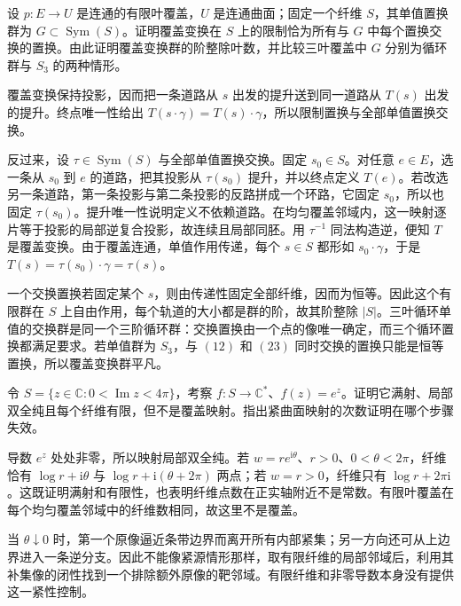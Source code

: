 \begin{exercise}
	\label{g4:ex:0201:deck-centralizer}
	设 \(p:E\to U\) 是连通的有限叶覆盖，\(U\) 是连通曲面；固定一个纤维 \(S\)，其单值置换群为 \(G\subset\operatorname{Sym}(S)\)。证明覆盖变换在 \(S\) 上的限制恰为所有与 \(G\) 中每个置换交换的置换。由此证明覆盖变换群的阶整除叶数，并比较三叶覆盖中 \(G\) 分别为循环群与 \(S_3\) 的两种情形。
\end{exercise}
\begin{solution}
	覆盖变换保持投影，因而把一条道路从 \(s\) 出发的提升送到同一道路从 \(T(s)\) 出发的提升。终点唯一性给出 \(T(s\cdot\gamma)=T(s)\cdot\gamma\)，所以限制置换与全部单值置换交换。

	反过来，设 \(\tau\in\operatorname{Sym}(S)\) 与全部单值置换交换。固定 \(s_0\in S\)。对任意 \(e\in E\)，选一条从 \(s_0\) 到 \(e\) 的道路，把其投影从 \(\tau(s_0)\) 提升，并以终点定义 \(T(e)\)。若改选另一条道路，第一条投影与第二条投影的反路拼成一个环路，它固定 \(s_0\)，所以也固定 \(\tau(s_0)\)。提升唯一性说明定义不依赖道路。在均匀覆盖邻域内，这一映射逐片等于投影的局部逆复合投影，故连续且局部同胚。用 \(\tau^{-1}\) 同法构造逆，便知 \(T\) 是覆盖变换。由于覆盖连通，单值作用传递，每个 \(s\in S\) 都形如 \(s_0\cdot\gamma\)，于是 \(T(s)=\tau(s_0)\cdot\gamma=\tau(s)\)。

	一个交换置换若固定某个 \(s\)，则由传递性固定全部纤维，因而为恒等。因此这个有限群在 \(S\) 上自由作用，每个轨道的大小都是群的阶，故其阶整除 \(|S|\)。三叶循环单值的交换群是同一个三阶循环群：交换置换由一个点的像唯一确定，而三个循环置换都满足要求。若单值群为 \(S_3\)，与 \((12)\) 和 \((23)\) 同时交换的置换只能是恒等置换，所以覆盖变换群平凡。
\end{solution}

\begin{exercise}
	\label{g4:ex:0201:noncompact-failure}
	令 \(S=\{z\in\mathbb C:0<\operatorname{Im}z<4\pi\}\)，考察 \(f:S\to\mathbb C^*\)、\(f(z)=e^z\)。证明它满射、局部双全纯且每个纤维有限，但不是覆盖映射。指出紧曲面映射的次数证明在哪个步骤失效。
\end{exercise}
\begin{solution}
	导数 \(e^z\) 处处非零，所以映射局部双全纯。若 \(w=re^{\mathrm{i}\theta}\)、\(r>0\)、\(0<\theta<2\pi\)，纤维恰有 \(\log r+\mathrm{i}\theta\) 与 \(\log r+\mathrm{i}(\theta+2\pi)\) 两点；若 \(w=r>0\)，纤维只有 \(\log r+2\pi\mathrm{i}\)。这既证明满射和有限性，也表明纤维点数在正实轴附近不是常数。有限叶覆盖在每个均匀覆盖邻域中的纤维数相同，故这里不是覆盖。

	当 \(\theta\downarrow0\) 时，第一个原像逼近条带边界而离开所有内部紧集；另一方向还可从上边界进入一条逆分支。因此不能像紧源情形那样，取有限纤维的局部邻域后，利用其补集像的闭性找到一个排除额外原像的靶邻域。有限纤维和非零导数本身没有提供这一紧性控制。
\end{solution}
